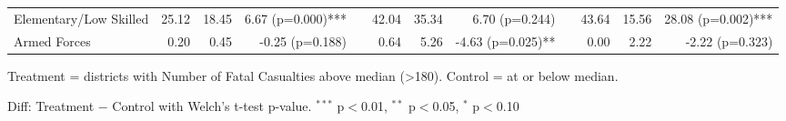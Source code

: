 \begin{table}[htbp]
\begin{tabular}{l rrr c rrr c rrr}
\quad Elementary/Low Skilled & 25.12 & 18.45 & 6.67 (p=0.000)*** &  & 42.04 & 35.34 & 6.70 (p=0.244) &  & 43.64 & 15.56 & 28.08 (p=0.002)*** \\
\quad Armed Forces & 0.20 & 0.45 & -0.25 (p=0.188) &  & 0.64 & 5.26 & -4.63 (p=0.025)** &  & 0.00 & 2.22 & -2.22 (p=0.323) \\
\bottomrule
\end{tabular}
\begin{tablenotes}
\small
\item Treatment = districts with Number of Fatal Casualties above median (>180). Control = at or below median.
\item Diff: Treatment $-$ Control with Welch's t-test p-value. $^{{***}}$ p$<$0.01, $^{{**}}$ p$<$0.05, $^{{*}}$ p$<$0.10
\end{tablenotes}
\end{table}